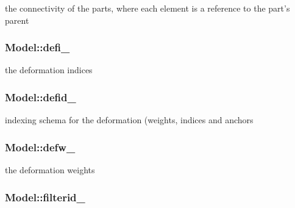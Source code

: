the connectivity of the parts, where each element is a reference to the part's parent 

\hypertarget{classModel_a477df0e7641f38782085d0a425625d12}{
\subsubsection[{defi\-\_\-}]{ {\bf \-Model\-::defi\-\_\-}}}\label{classModel_a477df0e7641f38782085d0a425625d12}


the deformation indices 

\hypertarget{classModel_a381f13c9035313ffd1cb67e07a2e84bd}{
\subsubsection[{defid\-\_\-}]{ {\bf \-Model\-::defid\-\_\-}}}\label{classModel_a381f13c9035313ffd1cb67e07a2e84bd}


indexing schema for the deformation (weights, indices and anchors 

\hypertarget{classModel_a1e1fba557437a9f4c0ef1535a64d83f2}{
\subsubsection[{defw\-\_\-}]{ {\bf \-Model\-::defw\-\_\-}}}\label{classModel_a1e1fba557437a9f4c0ef1535a64d83f2}


the deformation weights 

\hypertarget{classModel_a08e65111230ab010535cc9485dfd6d0d}{
\subsubsection[{filterid\-\_\-}]{ {\bf \-Model\-::filterid\-\_\-}}}\label{classModel_a08e65111230ab010535cc9485dfd6d0d}


